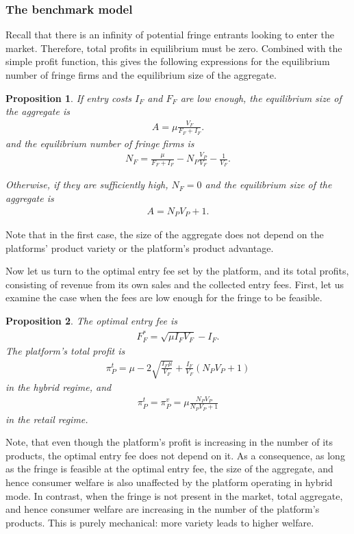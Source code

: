 \documentclass[a4paper]{article}
\newtheorem{proposition}{Proposition}
\begin{document}
\subsubsection{The benchmark model}

Recall that there is an infinity of potential fringe entrants looking to enter the market.
Therefore, total profits in equilibrium must be zero.
Combined with the simple profit function, this gives the following expressions for the equilibrium number of fringe firms and the equilibrium size of the aggregate.
\begin{proposition}
    If entry costs $I_F$ and $F_F$ are low enough, the equilibrium size of the aggregate is
    \begin{align}
        A = \mu \frac{V_F}{F_F + I_F}.
        \label{eq:aggregate_eq}
    \end{align}
    and the equilibrium number of fringe firms is
    \begin{align*}
        N_F = \frac{\mu}{F_F + I_F} - N_P \frac{V_P}{V_F} - \frac{1}{V_F}.
    \end{align*}

    Otherwise, if they are sufficiently high, $N_F = 0$ and the equilibrium size of the aggregate is
    \begin{align*}
        A = N_P V_P + 1.
    \end{align*}
\end{proposition}
Note that in the first case, the size of the aggregate does not depend on the platforms' product variety or the platform's product advantage.

Now let us turn to the optimal entry fee set by the platform, and its total profits, consisting of revenue from its own sales and the collected entry fees.
First, let us examine the case when the fees are low enough for the fringe to be feasible.

\begin{proposition}
    The optimal entry fee is
    \begin{align*}
        F_F^* = \sqrt{\mu I_F V_F} - I_F.
    \end{align*}
    The platform's total profit is
    \begin{align*}
        \pi_P^{t} = \mu - 2\sqrt{\frac{I_F \mu}{V_F}} + \frac{I_F}{V_F} (N_P V_P + 1)
    \end{align*}
    in the hybrid regime, and
    \begin{align*}
        \pi_P^{t} = \pi_P^{v} = \mu \frac{ N_P V_P}{N_P V_P + 1}
    \end{align*}
    in the retail regime.
\end{proposition}
Note, that even though the platform's profit is increasing in the number of its products, the optimal entry fee does not depend on it.
As a consequence, as long as the fringe is feasible at the optimal entry fee, the size of the aggregate, and hence consumer welfare is also unaffected by the platform operating in hybrid mode.
In contrast, when the fringe is not present in the market, total aggregate, and hence consumer welfare are increasing in the number of the platform's products.
This is purely mechanical: more variety leads to higher welfare.
\end{document}
